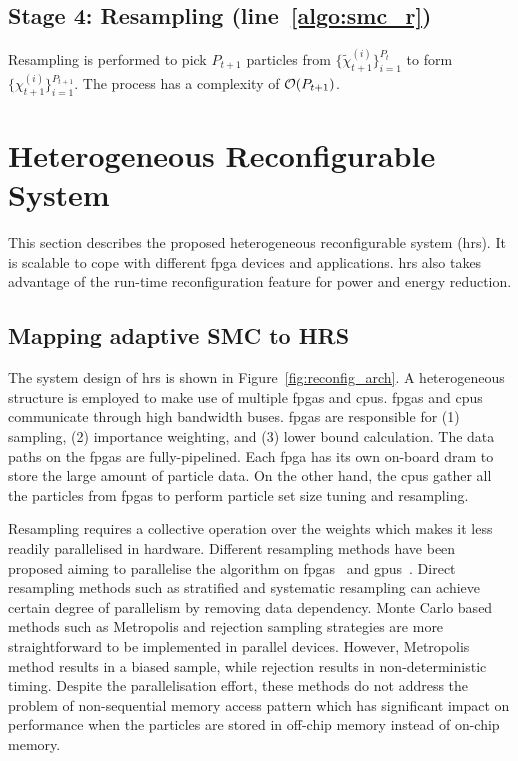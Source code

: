 \subsection[Stage 4: Resampling]{Stage 4: Resampling (line~\ref{algo:smc_r})}
Resampling is performed to pick $P_{t+1}$ particles from $\{\widetilde{\chi}_{t+1}^{(i)}\}^{P_t}_{i=1}$ to form $\{\chi_{t+1}^{(i)}\}^{P_{t+1}}_{i=1}$.
The process has a complexity of $\mathop{}\mathopen{}\mathcal{O}\mathopen{}\left(P_{t+1}\right)$.

\section{Heterogeneous Reconfigurable System}
\label{sec:reconfig_hrs}

This section describes the proposed heterogeneous reconfigurable system (\gls{hrs}).
It is scalable to cope with different \gls{fpga} devices and applications.
\gls{hrs} also takes advantage of the run-time reconfiguration feature for power and energy reduction.

\subsection{Mapping adaptive SMC to HRS}
\label{sec:reconfig_arch}

The system design of \gls{hrs} is shown in Figure~\ref{fig:reconfig_arch}.
A heterogeneous structure is employed to make use of multiple \gls{fpga}s and \gls{cpu}s.
\gls{fpga}s and \gls{cpu}s communicate through high bandwidth buses.
\gls{fpga}s are responsible for (1) sampling, (2) importance weighting, and (3) lower bound calculation.
The data paths on the \gls{fpga}s are fully-pipelined.
Each \gls{fpga} has its own on-board \gls{dram} to store the large amount of particle data.
On the other hand, the \gls{cpu}s gather all the particles from \gls{fpga}s to perform particle set size tuning and resampling.

Resampling requires a collective operation over the weights which makes it less readily parallelised in hardware.
Different resampling methods have been proposed aiming to parallelise the algorithm on \glspl{fpga}~\cite{bolic05} and \glspl{gpu}~\cite{murray14}.
Direct resampling methods such as stratified and systematic resampling can achieve certain degree of parallelism by removing data dependency.
Monte Carlo based methods such as Metropolis and rejection sampling strategies are more straightforward to be implemented in parallel devices.
However, Metropolis method results in a biased sample, while rejection results in non-deterministic timing.
Despite the parallelisation effort, these methods do not address the problem of non-sequential memory access pattern which has significant impact on performance when the particles are stored in off-chip memory instead of on-chip memory.

